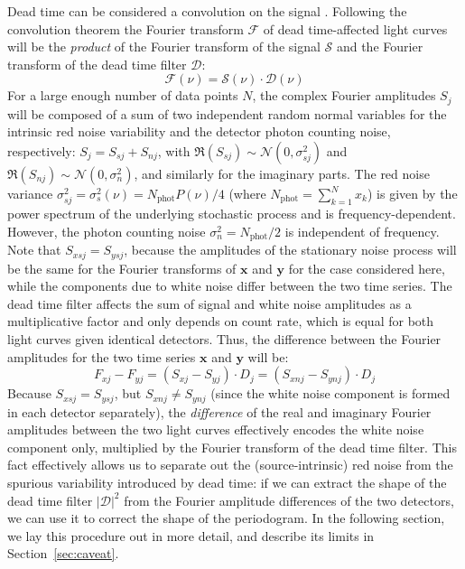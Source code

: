\documentclass[twocolumn]{aastex61}
\newcommand{\Normal}{\ensuremath{{\mathcal N}}\xspace}
\begin{document}
Dead time can be considered a convolution on the signal \citep{Vikhlinin+94}. 
Following the convolution theorem the Fourier transform $\mathcal{F}$ of dead time-affected light curves will be the \textit{product} of the Fourier transform of the signal $\mathcal{S}$ and the Fourier transform of the dead time filter $\mathcal{D}$:
\begin{equation}
\mathcal{F}(\nu) = \mathcal{S}(\nu)\cdot\mathcal{D}(\nu)
\end{equation}
For a large enough number of data points $N$, the complex Fourier amplitudes $S_j$ will be composed of a sum of two independent random normal variables for the intrinsic red noise variability and the detector photon counting noise, respectively: $S_j = S_{sj} + S_{nj}$, with $\Re (S_{sj}) \sim \Normal(0, \sigma_{sj}^2)$ and $\Re(S_{nj}) \sim \Normal(0, \sigma_n^2)$, and similarly for the imaginary parts.
The red noise variance $\sigma_{sj}^2 = \sigma_{s}^2(\nu) = N_\mathrm{phot}P(\nu)/4$ (where $N_{\mathrm{phot}} = \sum_{k=1}^{N}{x_k}$) is given by the power spectrum of the underlying stochastic process and is frequency-dependent. However, the photon counting noise $\sigma_n^2 = N_\mathrm{phot}/2$ is independent of frequency. 
Note that $S_{xsj} = S_{ysj}$, because the amplitudes of the stationary noise process will be the same for the Fourier transforms of $\mathbf{x}$ and $\mathbf{y}$ for the case considered here, while the components due to white noise differ between the two time series.
The dead time filter affects the sum of signal and white noise amplitudes as a multiplicative factor and only depends on count rate, which is equal for both light curves given identical detectors.
Thus, the difference between the Fourier amplitudes for the two time series $\mathbf{x}$ and $\mathbf{y}$ will be:
\begin{equation}
F_{xj} - F_{yj} = (S_{xj} - S_{yj})\cdot D_j = (S_{xnj} - S_{ynj})\cdot D_j
\end{equation}
Because $S_{xsj} = S_{ysj}$, but $S_{xnj} \neq S_{ynj}$ (since the white noise component is formed in each detector separately), the \textit{difference} of the real and imaginary Fourier amplitudes between the two light curves effectively encodes the white noise component only, multiplied by the Fourier transform of the dead time filter.
This fact effectively allows us to separate out the (source-intrinsic) red noise from the spurious variability introduced by dead time: if we can extract the shape of the dead time filter $|\mathcal{D}|^2$ from the Fourier amplitude differences of the two detectors, we can use it to correct the shape of the periodogram. In the following section, we lay this procedure out in more detail, and describe its limits in Section~\ref{sec:caveat}.
\end{document}
